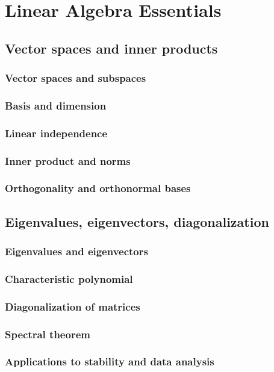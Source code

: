 ﻿\chapter{Linear Algebra Essentials}
\section{Vector spaces and inner products}
\subsection{Vector spaces and subspaces}
\subsection{Basis and dimension}
\subsection{Linear independence}
\subsection{Inner product and norms}
\subsection{Orthogonality and orthonormal bases}

\section{Eigenvalues, eigenvectors, diagonalization}
\subsection{Eigenvalues and eigenvectors}
\subsection{Characteristic polynomial}
\subsection{Diagonalization of matrices}
\subsection{Spectral theorem}
\subsection{Applications to stability and data analysis}


